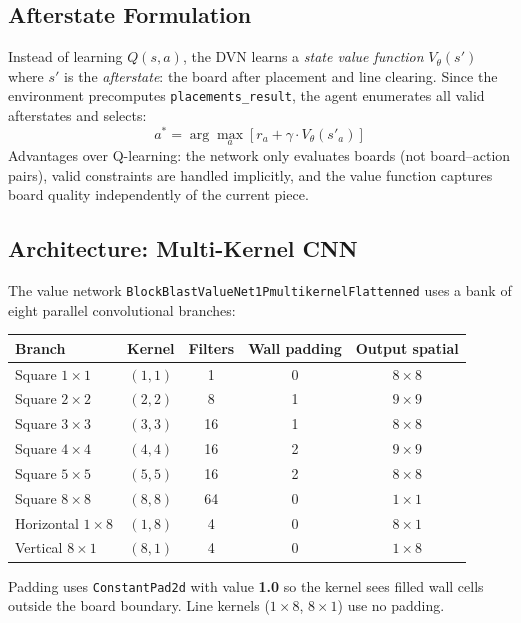 \documentclass[10pt]{article}
\begin{document}
\subsection{Afterstate Formulation}

Instead of learning $Q(s, a)$, the DVN learns a \emph{state value function} $V_\theta(s')$ where $s'$ is the \emph{afterstate}: the board after placement and line clearing. Since the environment precomputes \texttt{placements\_result}, the agent enumerates all valid afterstates and selects:
\[
a^* = \arg\max_a \left[ r_a + \gamma \cdot V_\theta(s'_a) \right]
\]
Advantages over Q-learning: the network only evaluates boards (not board--action pairs), valid constraints are handled implicitly, and the value function captures board quality independently of the current piece.

\subsection{Architecture: Multi-Kernel CNN}

The value network \texttt{BlockBlastValueNet1PmultikernelFlattenned} uses a bank of eight parallel convolutional branches:

\begin{center}
\begin{tabular}{lcccc}
\toprule
Branch & Kernel & Filters & Wall padding & Output spatial \\
\midrule
Square $1\times1$ & $(1,1)$ & 1  & 0 & $8\times8$ \\
Square $2\times2$ & $(2,2)$ & 8  & 1 & $9\times9$ \\
Square $3\times3$ & $(3,3)$ & 16 & 1 & $8\times8$ \\
Square $4\times4$ & $(4,4)$ & 16 & 2 & $9\times9$ \\
Square $5\times5$ & $(5,5)$ & 16 & 2 & $8\times8$ \\
Square $8\times8$ & $(8,8)$ & 64 & 0 & $1\times1$ \\
Horizontal $1\times8$ & $(1,8)$ & 4  & 0 & $8\times1$ \\
Vertical $8\times1$   & $(8,1)$ & 4  & 0 & $1\times8$ \\
\bottomrule
\end{tabular}
\end{center}

Padding uses \texttt{ConstantPad2d} with value \textbf{1.0} so the kernel sees filled wall cells outside the board boundary. Line kernels ($1\times8$, $8\times1$) use no padding.
\end{document}
